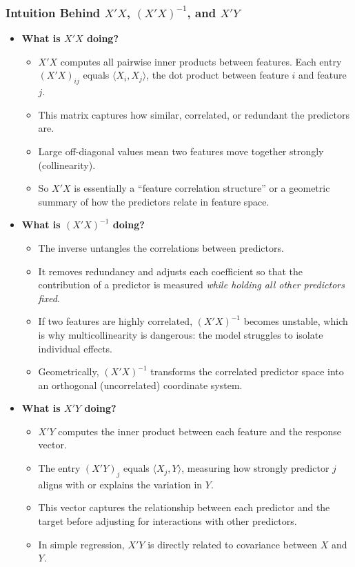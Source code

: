 \documentclass[11pt,a4paper]{article}
\begin{document}
\subsubsection{Intuition Behind $X'X$, $(X'X)^{-1}$, and $X'Y$}

\begin{itemize}
    \item \textbf{What is $X'X$ doing?}  
    \begin{itemize}
        \item $X'X$ computes all pairwise inner products between features.  
              Each entry $(X'X)_{ij}$ equals $\langle X_i, X_j \rangle$, the dot product between feature $i$ and feature $j$.  
        \item This matrix captures how similar, correlated, or redundant the predictors are.  
        \item Large off-diagonal values mean two features move together strongly (collinearity).  
        \item So $X'X$ is essentially a ``feature correlation structure'' or a geometric summary of how the predictors relate in feature space.
    \end{itemize}

    \item \textbf{What is $(X'X)^{-1}$ doing?}  
    \begin{itemize}
        \item The inverse untangles the correlations between predictors.  
        \item It removes redundancy and adjusts each coefficient so that the contribution of a predictor is measured \emph{while holding all other predictors fixed}.  
        \item If two features are highly correlated, $(X'X)^{-1}$ becomes unstable, which is why multicollinearity is dangerous: the model struggles to isolate individual effects.  
        \item Geometrically, $(X'X)^{-1}$ transforms the correlated predictor space into an orthogonal (uncorrelated) coordinate system.
    \end{itemize}

    \item \textbf{What is $X'Y$ doing?}  
    \begin{itemize}
        \item $X'Y$ computes the inner product between each feature and the response vector.  
        \item The entry $(X'Y)_j$ equals $\langle X_j, Y \rangle$, measuring how strongly predictor $j$ aligns with or explains the variation in $Y$.  
        \item This vector captures the relationship between each predictor and the target before adjusting for interactions with other predictors.
        \item In simple regression, $X'Y$ is directly related to covariance between $X$ and $Y$.
    \end{itemize}


\end{itemize}
\end{document}
